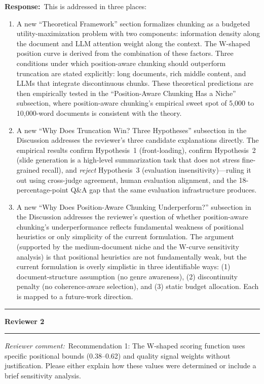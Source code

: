 \documentclass[11pt]{article}
\newcommand{\reviewer}[1]{\noindent\textbf{\large Reviewer #1}\medskip\hrule\medskip}
\newcommand{\rcomment}[1]{\noindent\textcolor{revcomment}{\textit{Reviewer comment:}}~#1\par\medskip}
\newcommand{\rresponse}[1]{\noindent\textcolor{response}{\textbf{Response:}}~#1\par\medskip\medskip}
\begin{document}
\rresponse{This is addressed in three places:
\begin{enumerate}
    \item A new ``Theoretical Framework'' section formalizes chunking as a budgeted utility-maximization problem with two components: information density along the document and LLM attention weight along the context. The W-shaped position curve is derived from the combination of these factors. Three conditions under which position-aware chunking should outperform truncation are stated explicitly: long documents, rich middle content, and LLMs that integrate discontinuous chunks. These theoretical predictions are then empirically tested in the ``Position-Aware Chunking Has a Niche'' subsection, where position-aware chunking's empirical sweet spot of 5{,}000 to 10{,}000-word documents is consistent with the theory.
    \item A new ``Why Does Truncation Win? Three Hypotheses'' subsection in the Discussion addresses the reviewer's three candidate explanations directly. The empirical results confirm Hypothesis~1 (front-loading), confirm Hypothesis~2 (slide generation is a high-level summarization task that does not stress fine-grained recall), and \emph{reject} Hypothesis~3 (evaluation insensitivity)---ruling it out using cross-judge agreement, human evaluation alignment, and the 18-percentage-point Q\&A gap that the same evaluation infrastructure produces.
    \item A new ``Why Does Position-Aware Chunking Underperform?'' subsection in the Discussion addresses the reviewer's question of whether position-aware chunking's underperformance reflects fundamental weakness of positional heuristics or only simplicity of the current formulation. The argument (supported by the medium-document niche and the W-curve sensitivity analysis) is that positional heuristics are not fundamentally weak, but the current formulation is overly simplistic in three identifiable ways: (1) document-structure assumption (no genre awareness), (2) discontinuity penalty (no coherence-aware selection), and (3) static budget allocation. Each is mapped to a future-work direction.
\end{enumerate}}

\bigskip
\hrule
\bigskip

\reviewer{2}

\rcomment{Recommendation 1: The W-shaped scoring function uses specific positional bounds (0.38--0.62) and quality signal weights without justification. Please either explain how these values were determined or include a brief sensitivity analysis.}
\end{document}
